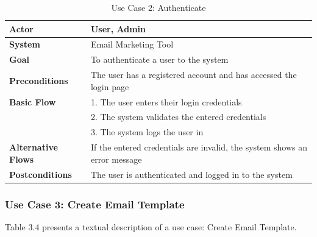 \begin{table}[ht]
	\centering
	\begin{tabularx}{\textwidth}{|l|X|}
		\hline
		\textbf{Actor}             & User, Admin                                                               \\
		\hline
		\textbf{System}            & Email Marketing Tool                                                      \\
		\hline
		\textbf{Goal}              & To authenticate a user to the system                                      \\
		\hline
		\textbf{Preconditions}     & The user has a registered account and has accessed the login page         \\
		\hline
		\textbf{Basic Flow}        & 1. The user enters their login credentials                                \\
		                           & 2. The system validates the entered credentials                           \\
		                           & 3. The system logs the user in                                            \\
		\hline
		\textbf{Alternative Flows} & If the entered credentials are invalid, the system shows an error message \\
		\hline
		\textbf{Postconditions}    & The user is authenticated and logged in to the system                     \\
		\hline
	\end{tabularx}
	\caption{Use Case 2: Authenticate}
	\label{tab:Use Case 2 Authenticate}
\end{table}

\clearpage

\subsubsection{Use Case 3: Create Email Template}

Table 3.4 presents a textual description of a use case: Create Email Template.

